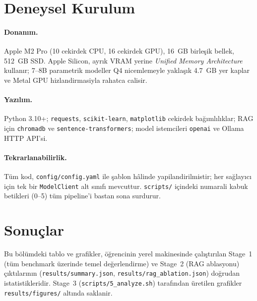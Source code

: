 \documentclass[11pt,a4paper]{article}
\begin{document}
\section{Deneysel Kurulum}
\label{sec:kurulum}
\paragraph{Donanım.} Apple M2 Pro (10 cekirdek CPU, 16 cekirdek GPU), 16~GB
birleşik bellek, 512~GB SSD. Apple Silicon, ayrık VRAM yerine \emph{Unified
Memory Architecture} kullanır; 7--8B parametrik modeller Q4 nicemlemeyle
yaklaşık 4.7~GB yer kaplar ve Metal GPU hizlandirmasiyla rahatca calisir.
\paragraph{Yazılım.} Python 3.10+; \texttt{requests}, \texttt{scikit-learn},
\texttt{matplotlib} cekirdek bağımlılıklar; RAG için \texttt{chromadb} ve
\texttt{sentence-transformers}; model istemcileri \texttt{openai} ve Ollama
HTTP API'si.
\paragraph{Tekrarlanabilirlik.} Tüm kod, \texttt{config/config.yaml} ile
şablon hâlinde yapilandirilmistir; her sağlayıcı için tek bir
\texttt{ModelClient} alt sınıfı mevcuttur. \texttt{scripts/} içindeki
numarali kabuk betikleri (0--5) tüm pipeline'i bastan sona surdurur.

\section{Sonuçlar}
\label{sec:sonuç}

Bu bölümdeki tablo ve grafikler, öğrencinin yerel makinesinde çalıştırılan
Stage~1 (tüm benchmark üzerinde temel değerlendirme) ve Stage~2 (RAG ablasyonu)
çıktılarının (\texttt{results/summary.json}, \texttt{results/rag\_ablation.json})
doğrudan istatistikleridir. Stage~3 (\texttt{scripts/5\_analyze.sh}) tarafından
üretilen grafikler \texttt{results/figures/} altında saklanir.
\end{document}
